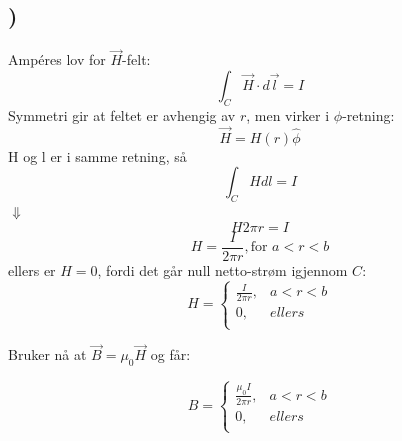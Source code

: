 \documentclass[report,12pt,norsk]{article}
\begin{document}
\subsection{)}

\begin{center}
Ampéres lov for $\vec{H}$-felt:
\[\int_{C}\vec{H} \cdot d\vec{l} = I\]
Symmetri gir at feltet er avhengig av $r$, men virker i $\phi$-retning:
\[\vec{H} = H(r)\hat{\phi}\]
H og l er i samme retning, så
\[\int_{C}Hdl = I\]
$\Downarrow$
\[H2\pi r = I\]
\[H = \frac{I}{2\pi r}, \text{for } a < r < b\]
ellers er $H=0$, fordi det går null netto-strøm igjennom $C$:
\[H = \begin{cases}
       \frac{I}{2\pi r}, & a < r < b\\
       0, & ellers\\
     \end{cases}\]

Bruker nå at $\vec{B} = \mu_{0} \vec{H}$ og får:

\[B = \begin{cases}
       \frac{\mu_{0} I}{2\pi r}, & a < r < b\\
       0, & ellers\\
     \end{cases}\]
     

\end{center}
\end{document}
